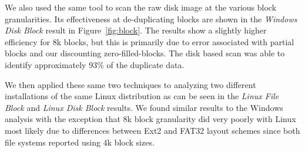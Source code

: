 We also used the same tool to scan the raw disk image at the
various block granularities.  Its effectiveness at de-duplicating blocks
are shown in the \emph{Windows Disk Block} result in Figure~\ref{fig:block}.
The results show a slightly higher efficiency for 8k blocks, but this is
primarily due to error associated with partial blocks and our discounting
zero-filled-blocks.  The disk based scan was able to identify approximately
93\% of the duplicate data.

We then applied these same two techniques to analyzing two different
installations of the same Linux distribution as can be seen in the
\emph{Linux File Block} and \emph{Linux Disk Block} results.  We found
similar results to the Windows analysis with the exception that 8k
block granularity did very poorly with Linux most likely due to differences
between Ext2 and FAT32 layout schemes since both file systems reported using
4k block sizes.

